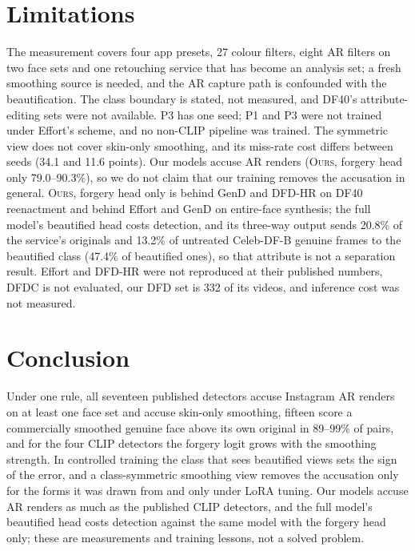 \documentclass[conference]{IEEEtran}
\newcommand{\oursB}{\textsc{Ours}, forgery head only}
\begin{document}
\section{Limitations}
The measurement covers four app presets, 27 colour filters, eight AR filters on two face sets and one retouching service that has
become an analysis set; a fresh smoothing source is needed, and the AR capture path is confounded with the beautification. The
class boundary is stated, not measured, and DF40's attribute-editing sets were not available. P3 has one seed; P1 and P3 were not
trained under Effort's scheme, and no non-CLIP pipeline was trained. The symmetric view does not cover skin-only smoothing, and
its miss-rate cost differs between seeds (34.1 and 11.6 points). Our models accuse AR renders (\oursB{} 79.0--90.3\%), so we do not
claim that our training removes the accusation in general. \oursB{} is behind GenD and DFD-HR on DF40 reenactment and behind Effort
and GenD on entire-face synthesis; the full model's beautified head costs detection, and its three-way output sends 20.8\% of the
service's originals and 13.2\% of untreated Celeb-DF-B genuine frames to the beautified class (47.4\% of beautified ones), so that
attribute is not a separation result. Effort and DFD-HR were not reproduced at their published numbers, DFDC is not evaluated,
our DFD set is 332 of its videos, and inference cost was not measured.

\section{Conclusion}
Under one rule, all seventeen published detectors accuse Instagram AR renders on at least one face set and accuse skin-only
smoothing, fifteen score a commercially smoothed genuine face above its own original in 89--99\% of pairs, and for the four CLIP
detectors the forgery logit grows with the smoothing strength. In controlled training the class that sees beautified views sets
the sign of the error, and a class-symmetric smoothing view removes the accusation only for the forms it was drawn from and only
under LoRA tuning. Our models accuse AR renders as much as the published CLIP detectors, and the full model's beautified head
costs detection against the same model with the forgery head only; these are measurements and training lessons, not a solved
problem.



\end{document}
